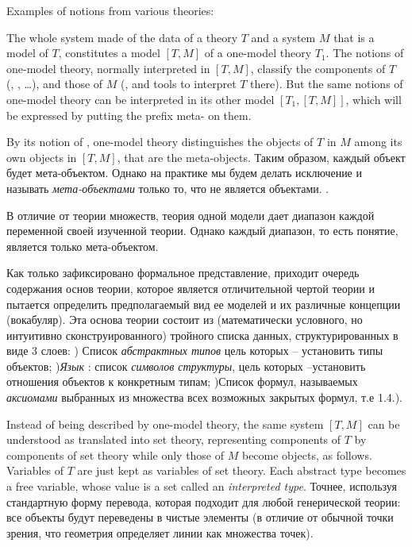 Examples of notions from various theories:
\sk
{}\sk


The whole system made of the data of a theory $T$ and a system $M$ that is a model of $T$, constitutes a model $[T,M]$ of a one-model theory $T_1$. The notions of one-model theory, normally interpreted in $[T,M]$, classify the components of $T$ (, , \dots), and those of $M$ (, and tools to interpret $T$ there). But the same notions of one-model theory can be interpreted in its other model $[T_1,[T,M]]$, which will be expressed by putting the prefix meta- on them. 

By its notion of , one-model theory distinguishes the objects of $T$ in $M$ among its own objects in $[T,M]$, that are the meta-objects. Таким образом, каждый объект будет мета-объектом. Однако на практике мы будем делать исключение и называть {\it мета-объектами} только то, что не является объектами. . 

В отличие от теории множеств, теория одной модели дает диапазон каждой переменной своей изученной теории. Однако каждый диапазон, то есть понятие, является только мета-объектом.

Как только зафиксировано формальное представление, приходит очередь содержания основ теории, которое является отличительной чертой теории и пытается определить предполагаемый вид ее моделей и их различные концепции (вокабуляр). Эта основа теории состоит из (математически условного, но интуитивно сконструированного) тройного списка данных, структурированных в виде 3 слоев:
) Список {\it абстрактных типов} цель которых – установить типы объектов;
){\it Язык } : список {\it символов структуры}, цель которых –установить отношения объектов к конкретным типам;
)Список формул, называемых  {\it  аксиомами}  выбранных из множества всех возможных закрытых формул, т.е 1.4.).


Instead of being described by one-model theory, the same system $[T,M]$ can be understood as translated into set theory, representing components of $T$ by components of set theory while only those of $M$ become objects, as follows.
Variables of $T$ are just kept as variables of set theory. Each abstract type becomes a free variable, whose value is a set called an {\it interpreted type}. 
Точнее, используя стандартную форму перевода, которая подходит для любой генерической теории: все объекты будут переведены в чистые элементы (в отличие от обычной точки зрения, что геометрия определяет линии как множества точек). 

